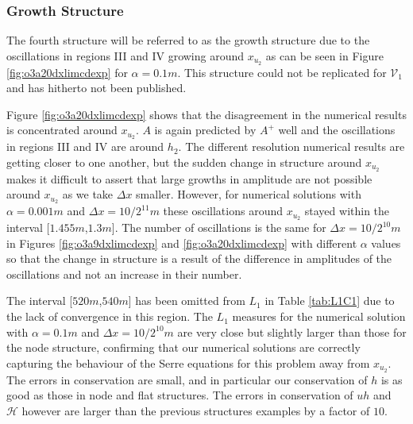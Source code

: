 \documentclass[times]{elsarticle}
\begin{document}
\subsubsection{Growth Structure}
The fourth structure will be referred to as the growth structure due to the oscillations in regions III and IV growing around $x_{u_2}$ as can be seen in Figure \ref{fig:o3a20dxlimcdexp} for $\alpha = 0.1m$. This structure could not be replicated for $\mathcal{V}_1$ and has hitherto not been published. 

Figure \ref{fig:o3a20dxlimcdexp} shows that the disagreement in the numerical results is concentrated around $x_{u_2}$. $A$ is again predicted by $A^+$ well and the oscillations in regions III and IV are around $h_2$. The different resolution numerical results are getting closer to one another, but the sudden change in structure around $x_{u_2}$ makes it difficult to assert that large growths in amplitude are not possible around $x_{u_2}$ as we take $\Delta x$ smaller. However, for numerical solutions with $\alpha = 0.001m$ and $\Delta x = 10 / 2^{11}m$ these oscillations around $x_{u_2}$ stayed within the interval [$1.455m$,$1.3m$]. The number of oscillations is the same for $\Delta x = 10 / 2^{10}m$ in Figures \ref{fig:o3a9dxlimcdexp} and \ref{fig:o3a20dxlimcdexp} with different $\alpha$ values so that the change in structure is a result of the difference in amplitudes of the oscillations and not an increase in their number.

The interval [$520m$,$540m$] has been omitted from $L_1$ in Table \ref{tab:L1C1} due to the lack of convergence in this region. The $L_1$ measures for the numerical solution with $\alpha = 0.1m$ and $\Delta x = 10/2^{10}m$ are very close but slightly larger than those for the node structure, confirming that our numerical solutions are correctly capturing the behaviour of the Serre equations for this problem away from $x_{u_2}$. The errors in conservation are small, and in particular our conservation of $h$ is as good as those in node and flat structures. The errors in conservation of $uh$ and $\mathcal{H}$ however are larger than the previous structures examples by a factor of $10$.
\end{document}
